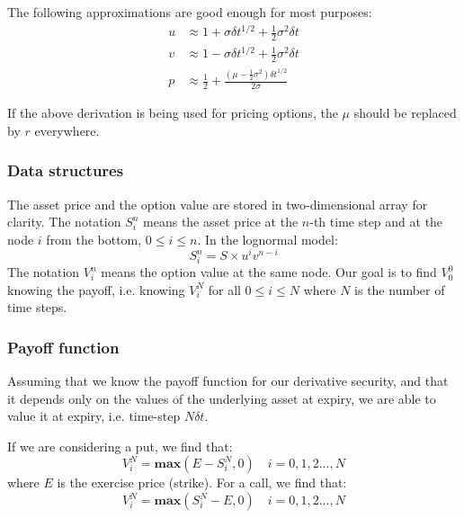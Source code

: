 The following approximations are good enough for most purposes:
\begin{align}
    u &\approx 1 + \sigma \delta t^{1/2} + \frac{1}{2} \sigma^2 \delta t \\
    v &\approx 1 - \sigma \delta t^{1/2} + \frac{1}{2} \sigma^2 \delta t \\
    p &\approx \frac{1}{2} + \frac{\left( \mu - \frac{1}{2} \sigma^2 \right) \delta t^{1/2}}{2 \sigma}
\end{align}

If the above derivation is being used for pricing options, the $\mu$ should be replaced by $r$ everywhere.



\subsubsection{Data structures}
The asset price and the option value are stored in two-dimensional array for clarity. The notation $S_i^n$ means the asset price at the $n$-th time step and at the node $i$ from the bottom, $0 \leq i \leq n$. In the lognormal model:
\begin{equation}
    S_i^n = S \times u^i v^{n-i}
\end{equation}
The notation $V_i^n$ means the option value at the same node. Our goal is to find $V_0^0$ knowing the payoff, i.e. knowing $V_i^N$ for all $0 \leq i \leq N$ where $N$ is the number of time steps. 


\subsubsection{Payoff function}
Assuming that we know the payoff function for our derivative security, and that it depends only on the values of the underlying asset at expiry, we are able to value it at expiry, i.e. time-step $N \delta t$.

If we are considering a put, we find that:
\begin{equation}
    V_i^N = \textbf{max} \left( E - S_i^N, 0 \right) \quad i = 0,1,2...,N
\end{equation}
where $E$ is the exercise price (strike). For a call, we find that:
\begin{equation}
    V_i^N = \textbf{max} \left( S_i^N - E, 0 \right) \quad i = 0,1,2...,N
\end{equation}



